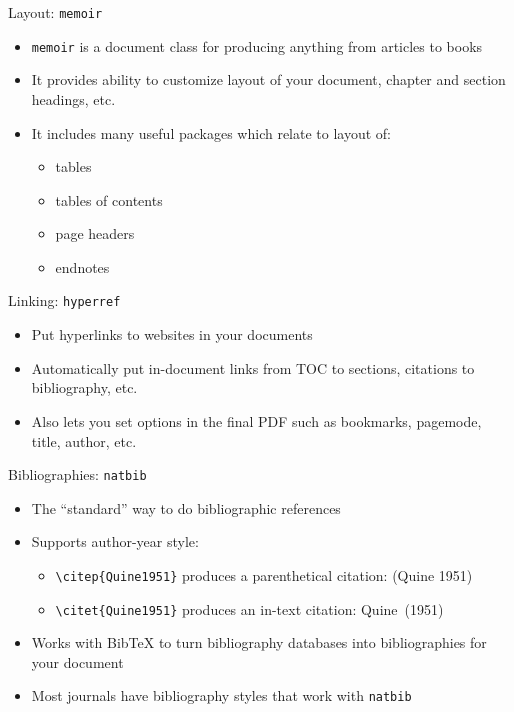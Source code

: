 
\begin{frame}{Layout: \texttt{memoir}}

\begin{itemize}
\item \texttt{memoir} is a document class for producing anything from
  articles to books
\item It provides ability to customize layout of your document,
  chapter and section headings, etc.
\item It includes many useful packages which relate to layout of:
\begin{itemize}
\item tables
\item tables of contents
\item page headers
\item endnotes
\end{itemize}
\end{itemize}

\end{frame}

\begin{frame}{Linking: \texttt{hyperref}}

\begin{itemize}
\item Put hyperlinks to websites in your documents
\item Automatically put in-document links from TOC to sections,
  citations to bibliography, etc.
\item Also lets you set options in the final PDF such as bookmarks,
  pagemode, title, author, etc.
\end{itemize}

\end{frame}

\begin{frame}[fragile]{Bibliographies: \texttt{natbib}}

\begin{itemize}
\item The ``standard'' way to do bibliographic references
\item Supports author-year style:
\begin{itemize}
\item \verb+\citep{Quine1951}+ produces a parenthetical citation: (Quine 1951)
\item \verb+\citet{Quine1951}+ produces an in-text citation: Quine~(1951)
\end{itemize}
\item Works with Bib\TeX{} to turn bibliography databases into
  bibliographies for your document
\item Most journals have bibliography styles that work with \texttt{natbib} 
\end{itemize}

\end{frame}


